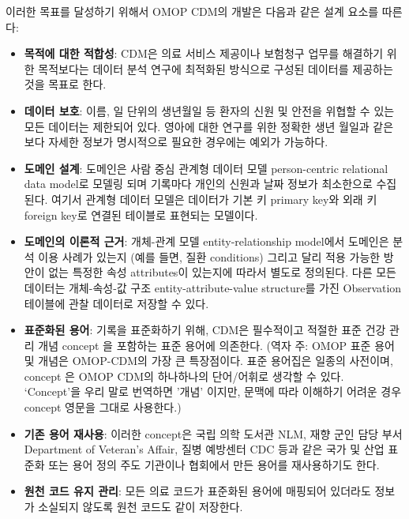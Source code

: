 \documentclass[10.5pt]{book}
\providecommand{\tightlist}{%
  \setlength{\itemsep}{0pt}\setlength{\parskip}{0pt}}
\theoremstyle{definition}
\theoremstyle{definition}
\theoremstyle{definition}
\theoremstyle{remark}
\begin{document}
이러한 목표를 달성하기 위해서 OMOP CDM의 개발은 다음과 같은 설계 요소를
따른다:

\begin{itemize}
\tightlist
\item
  \textbf{목적에 대한 적합성}: CDM은 의료 서비스 제공이나 보험청구
  업무를 해결하기 위한 목적보다는 데이터 분석 연구에 최적화된 방식으로
  구성된 데이터를 제공하는 것을 목표로
  한다.
\item
  \textbf{데이터 보호}: 이름, 일 단위의 생년월일 등 환자의 신원 및
  안전을 위협할 수 있는 모든 데이터는 제한되어 있다. 영아에 대한 연구를
  위한 정확한 생년 월일과 같은 보다 자세한 정보가 명시적으로 필요한
  경우에는 예외가 가능하다.
\item
  \textbf{도메인 설계}: 도메인은 사람 중심 관계형 데이터 모델
  person-centric relational data model로 모델링 되며 기록마다 개인의
  신원과 날짜 정보가 최소한으로 수집된다. 여기서 관계형 데이터 모델은
  데이터가 기본 키 primary key와 외래 키 foreign key로 연결된 테이블로
  표현되는 모델이다.
\item
  \textbf{도메인의 이론적 근거}: 개체-관계 모델 entity-relationship
  model에서 도메인은 분석 이용 사례가 있는지 (예를 들면, 질환
  conditions) 그리고 달리 적용 가능한 방안이 없는 특정한 속성
  attributes이 있는지에 따라서 별도로 정의된다. 다른 모든 데이터는
  개체-속성-값 구조 entity-attribute-value structure를 가진 Observation
  테이블에 관찰 데이터로 저장할 수
  있다.
\item
  \textbf{표준화된 용어}: 기록을 표준화하기 위해, CDM은 필수적이고
  적절한 표준 건강 관리 개념 concept 을 포함하는 표준 용어에 의존한다.
  (역자 주: OMOP 표준 용어 및 개념은 OMOP-CDM의 가장 큰 특장점이다. 표준
  용어집은 일종의 사전이며, concept 은 OMOP CDM의 하나하나의 단어/어휘로
  생각할 수 있다. `Concept'을 우리 말로 번역하면 '개념' 이지만, 문맥에
  따라 이해하기 어려운 경우 concept 영문을 그대로 사용한다.)
\item
  \textbf{기존 용어 재사용}: 이러한 concept은 국립 의학 도서관 NLM, 재향
  군인 담당 부서 Department of Veteran's Affair, 질병 예방센터 CDC 등과
  같은 국가 및 산업 표준화 또는 용어 정의 주도 기관이나 협회에서 만든
  용어를 재사용하기도 한다.
\item
  \textbf{원천 코드 유지 관리}: 모든 의료 코드가 표준화된 용어에
  매핑되어 있더라도 정보가 소실되지 않도록 원천 코드도 같이
  저장한다.

\end{itemize}
\end{document}
